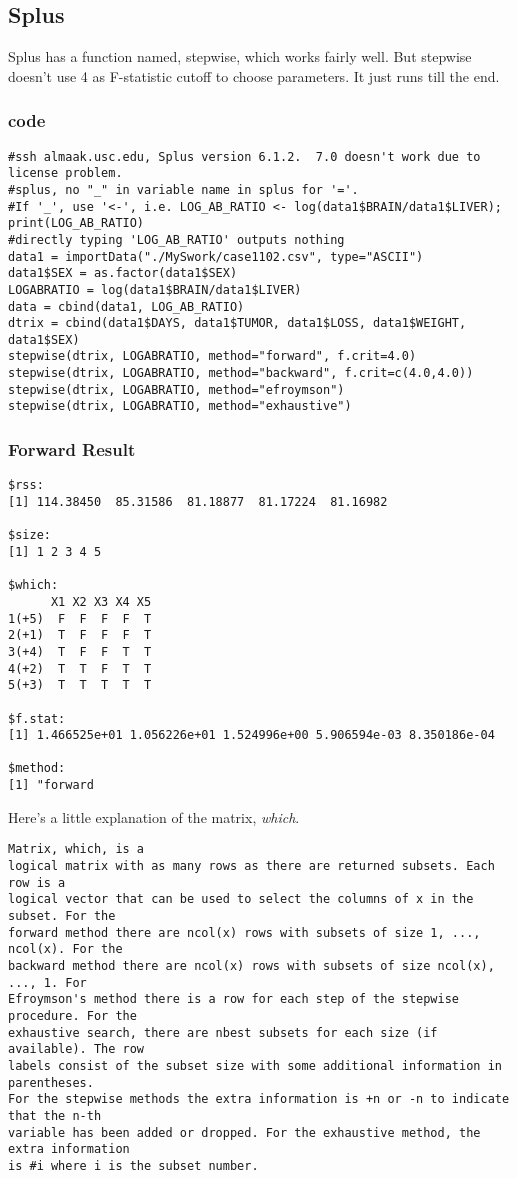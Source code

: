 \documentclass[a4paper,10pt]{article}
\begin{document}
\subsection{Splus}
Splus has a function named, stepwise, which works fairly well. But stepwise doesn't use 4 as F-statistic cutoff to choose parameters. It just runs till the end.

\subsubsection{code}
\begin{verbatim}
#ssh almaak.usc.edu, Splus version 6.1.2.  7.0 doesn't work due to license problem.
#splus, no "_" in variable name in splus for '='.
#If '_', use '<-', i.e. LOG_AB_RATIO <- log(data1$BRAIN/data1$LIVER); print(LOG_AB_RATIO)
#directly typing 'LOG_AB_RATIO' outputs nothing
data1 = importData("./MySwork/case1102.csv", type="ASCII")
data1$SEX = as.factor(data1$SEX)
LOGABRATIO = log(data1$BRAIN/data1$LIVER)
data = cbind(data1, LOG_AB_RATIO)
dtrix = cbind(data1$DAYS, data1$TUMOR, data1$LOSS, data1$WEIGHT, data1$SEX)
stepwise(dtrix, LOGABRATIO, method="forward", f.crit=4.0)
stepwise(dtrix, LOGABRATIO, method="backward", f.crit=c(4.0,4.0))
stepwise(dtrix, LOGABRATIO, method="efroymson")
stepwise(dtrix, LOGABRATIO, method="exhaustive")
\end{verbatim}

\subsubsection{Forward Result}
\begin{verbatim}
$rss:
[1] 114.38450  85.31586  81.18877  81.17224  81.16982

$size:
[1] 1 2 3 4 5

$which:
      X1 X2 X3 X4 X5
1(+5)  F  F  F  F  T
2(+1)  T  F  F  F  T
3(+4)  T  F  F  T  T
4(+2)  T  T  F  T  T
5(+3)  T  T  T  T  T

$f.stat:
[1] 1.466525e+01 1.056226e+01 1.524996e+00 5.906594e-03 8.350186e-04

$method:
[1] "forward
\end{verbatim}

Here's a little explanation of the matrix, \emph{which}.
\begin{verbatim}
Matrix, which, is a 
logical matrix with as many rows as there are returned subsets. Each row is a
logical vector that can be used to select the columns of x in the subset. For the
forward method there are ncol(x) rows with subsets of size 1, ..., ncol(x). For the
backward method there are ncol(x) rows with subsets of size ncol(x), ..., 1. For
Efroymson's method there is a row for each step of the stepwise procedure. For the
exhaustive search, there are nbest subsets for each size (if available). The row
labels consist of the subset size with some additional information in parentheses.
For the stepwise methods the extra information is +n or -n to indicate that the n-th
variable has been added or dropped. For the exhaustive method, the extra information
is #i where i is the subset number.
\end{verbatim}
\end{document}
